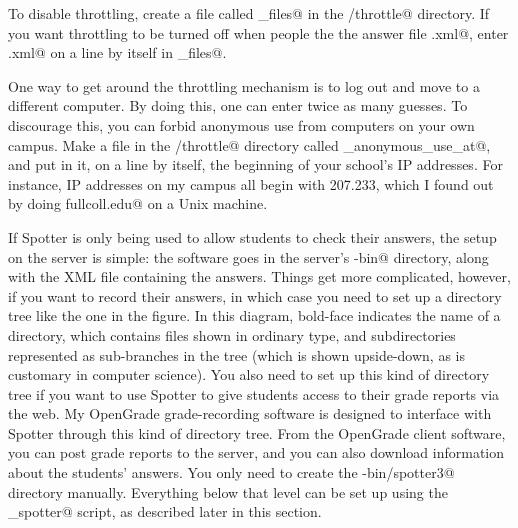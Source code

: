 \documentclass{doc}
\begin{document}
To disable throttling, create a file called \verb@exempt_files@ in the
\verb@spotter/throttle@ directory. If you want throttling to be turned
off when people the the answer file \verb@foo.xml@, enter \verb@foo.xml@
on a line by itself in \verb@exempt_files@.

One way to get around the throttling mechanism is to log out and move to
a different computer. By doing this, one can enter twice as many guesses.
To discourage this, you can forbid anonymous use from computers on your
own campus. Make a file in the \verb@spotter/throttle@ directory called
\verb@forbid_anonymous_use_at@, and put in it, on a line by itself,
the beginning of your school's IP addresses. For instance, IP
addresses on my campus all begin with 207.233, which I found out by
doing \verb@dig fullcoll.edu@ on a Unix machine.


If Spotter is only being used to allow students to check their answers, the
setup on the server is simple: the software goes in the server's \verb@cgi-bin@
directory, along with the XML file containing the answers. Things get more
complicated, however, if you want to record their answers, in which case
you need to set up a directory tree like the one in the figure. In this
diagram, bold-face indicates the name of a directory, which contains files
shown in ordinary type, and subdirectories represented as sub-branches in
the tree (which is shown upside-down, as is customary in computer science).
You also need to set up this kind of directory tree if you want to use Spotter
to give students access to their grade reports via the web. My OpenGrade
grade-recording software is designed to interface with Spotter through this
kind of directory tree. From the OpenGrade client software, you 
can post grade reports to the server, and you can also download information
about the students' answers. You only need to create the \verb@cgi-bin/spotter3@
directory manually. Everything below that level can be set up using the
\verb@admin_spotter@ script, as described later in this section.
\end{document}
